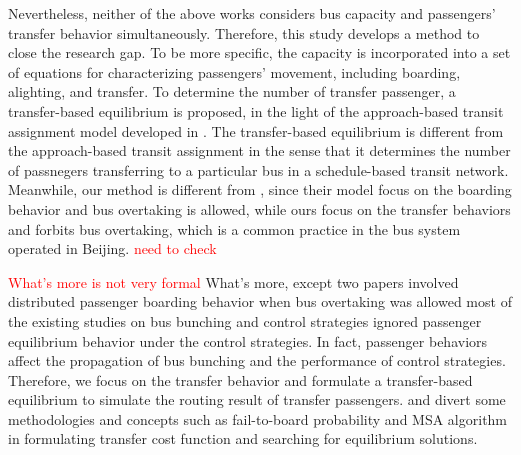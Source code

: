 \documentclass[smallextended]{svjour3}       %
\begin{document}
\begin{Abstract}
Nevertheless, neither of the above works considers bus capacity and passengers' transfer behavior simultaneously. Therefore, this study develops a method to close the research gap. To be more specific, the capacity is incorporated into a set of equations for characterizing passengers' movement, including boarding, alighting, and transfer. To determine the number of transfer passenger, a transfer-based equilibrium is proposed, in the light of the approach-based transit assignment model developed in \citep{2016Sun,2013Long,2014Szeto,2016Jiang}. The transfer-based equilibrium is different from the approach-based transit assignment in the sense that it determines the number of passnegers transferring to a particular bus in a schedule-based transit network. Meanwhile, our method is different from \citep{2016Sun,2017Wu}, since their model focus on the boarding behavior and bus overtaking is allowed, while ours focus on the transfer behaviors and forbits bus overtaking, which is a common practice in the bus system operated in Beijing. \textcolor{red}{need to check}

\textcolor{red}{What's more is not very formal}
What's more, except two papers involved distributed passenger boarding behavior when bus overtaking was allowed \citep{2016Sun,2017Wu}
most of the existing studies on bus bunching and control strategies ignored passenger equilibrium behavior under the control strategies.
In fact, passenger behaviors affect the propagation of bus bunching and the performance of control strategies.
Therefore, we focus on the transfer behavior and formulate a transfer-based equilibrium to simulate the routing result of transfer passengers.
and divert some methodologies and concepts such as fail-to-board probability and MSA algorithm in formulating transfer cost function and searching for equilibrium solutions.


\end{Abstract}
\end{document}
